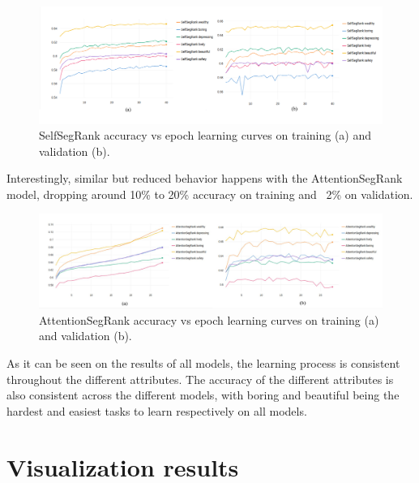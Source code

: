 \begin{figure}[ht]
	\begin{center}
	\includegraphics[width=1\textwidth]{./figures/selfsegrank_graph.png}
	\caption[SelfSegRank Training curves]{
        SelfSegRank accuracy vs epoch learning curves on training (a) and validation (b).
        }
	\label{fig:selfsegrank_graph}
	\end{center}
\end{figure}

Interestingly, similar but reduced behavior happens with the AttentionSegRank model,
dropping around 10\% to 20\% accuracy on training and ~2\% on validation.

\begin{figure}[ht]
	\begin{center}
	\includegraphics[width=1\textwidth]{./figures/AttentionSegRank_graph.jpg}
	\caption[AttentionSegRank Training curves]{
        AttentionSegRank accuracy vs epoch learning curves on training (a) and validation (b).
        }
	\label{fig:attentionsegrank_graph}
	\end{center}
\end{figure}



As it can be seen on the results of all models, the learning process is consistent throughout
the different attributes. The accuracy of the different attributes is also consistent across the
different models, with boring and beautiful being the hardest and easiest tasks to learn respectively
on all models.


\section{Visualization results}
\label{sec:visualization_results}

